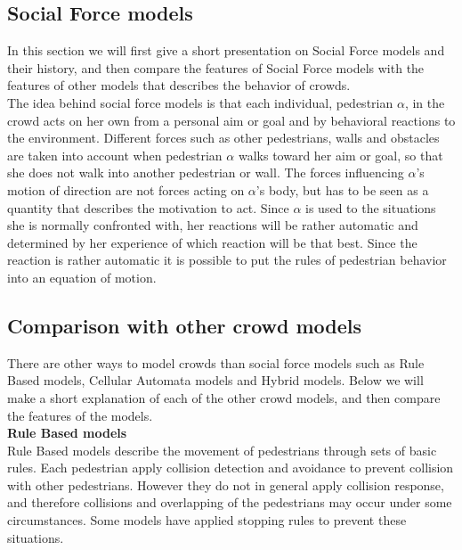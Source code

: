 \subsection{Social Force models}
In this section we will first give a short presentation on Social Force models and their history,
and then compare the features of Social Force models with the features of other models that describes
the behavior of crowds.
\\

The idea behind social force models is that each individual, pedestrian $\alpha$, in the crowd acts 
on her own from a personal aim or goal and by behavioral reactions to the environment. 
Different forces such as other pedestrians, walls and obstacles are taken into account 
when pedestrian $\alpha$ walks toward her aim or goal, so that she does not walk 
into another pedestrian or wall. The forces influencing $\alpha$'s motion 
of direction are not forces acting on $\alpha$'s body, but has to be seen as a quantity 
that describes the motivation to act. Since $\alpha$ is used to the situations 
she is normally confronted with, her reactions will be rather automatic and 
determined by her experience of which reaction will be that best. Since the reaction 
is rather automatic it is possible to put the rules of pedestrian behavior into an equation 
of motion.\cite{social-force}

\subsection{Comparison with other crowd models}
There are other ways to model crowds than social force models such as Rule Based models, 
Cellular Automata models and Hybrid models. Below we will make a short explanation of each of the 
other crowd models, and then compare the features of the models.\\												


\textbf{Rule Based models}\\
Rule Based models describe the movement of pedestrians through sets of basic rules. Each 
pedestrian apply collision detection and avoidance to prevent collision with other pedestrians. 
However they do not in general apply collision response, and therefore collisions and overlapping 
of the pedestrians may occur under some circumstances. Some models have applied stopping 
rules to prevent these situations.\cite{Comparison}

